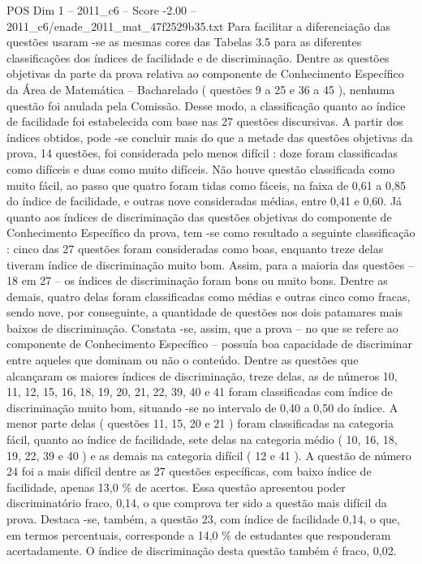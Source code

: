 \begin{textsample}{POS Dim 1 – 2011\_c6 – Score -2.00 – 2011\_c6/enade\_2011\_mat\_47f2529b35.txt}
Para facilitar a diferenciação das questões usaram -se as mesmas cores das Tabelas 3.5 para as diferentes classificações dos índices de facilidade e de discriminação.
Dentre as questões objetivas da parte da prova relativa ao componente de Conhecimento Específico da Área de Matemática – Bacharelado ( questões 9 a 25 e 36 a 45 ), nenhuma questão foi anulada pela Comissão.
Desse modo, a classificação quanto ao índice de facilidade foi estabelecida com base nas 27 questões discursivas.
A partir dos índices obtidos, pode -se concluir mais do que a metade das questões objetivas da prova, 14 questões, foi considerada pelo menos difícil : doze foram classificadas como difíceis e duas como muito difíceis.
Não houve questão classificada como muito fácil, ao passo que quatro foram tidas como fáceis, na faixa de 0,61 a 0,85 do índice de facilidade, e outras nove consideradas médias, entre 0,41 e 0,60.
Já quanto aos índices de discriminação das questões objetivas do componente de Conhecimento Específico da prova, tem -se como resultado a seguinte classificação : cinco das 27 questões foram consideradas como boas, enquanto treze delas tiveram índice de discriminação muito bom.
Assim, para a maioria das questões – 18 em 27 – os índices de discriminação foram bons ou muito bons.
Dentre as demais, quatro delas foram classificadas como médias e outras cinco como fracas, sendo nove, por conseguinte, a quantidade de questões nos dois patamares mais baixos de discriminação.
Constata -se, assim, que a prova – no que se refere ao componente de Conhecimento Específico – possuía boa capacidade de discriminar entre aqueles que dominam ou não o conteúdo.
Dentre as questões que alcançaram os maiores índices de discriminação, treze delas, as de números 10, 11, 12, 15, 16, 18, 19, 20, 21, 22, 39, 40 e 41 foram classificadas com índice de discriminação muito bom, situando -se no intervalo de 0,40 a 0,50 do índice.
A menor parte delas ( questões 11, 15, 20 e 21 ) foram classificadas na categoria fácil, quanto ao índice de facilidade, sete delas na categoria médio ( 10, 16, 18, 19, 22, 39 e 40 ) e as demais na categoria difícil ( 12 e 41 ).
A questão de número 24 foi a mais difícil dentre as 27 questões específicas, com baixo índice de facilidade, apenas 13,0 \% de acertos.
Essa questão apresentou poder discriminatório fraco, 0,14, o que comprova ter sido a questão mais difícil da prova.
Destaca -se, também, a questão 23, com índice de facilidade 0,14, o que, em termos percentuais, corresponde a 14,0 \% de estudantes que responderam acertadamente.
O índice de discriminação desta questão também é fraco, 0,02.

\end{textsample}
